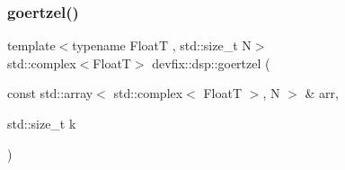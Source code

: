 \subsubsection{\texorpdfstring{goertzel()}{goertzel()}\hspace{0.1cm}{\footnotesize\ttfamily [3/3]}}
{\footnotesize\ttfamily template$<$typename FloatT , std\+::size\+\_\+t N$>$ \\
std\+::complex$<$FloatT$>$ devfix\+::dsp\+::goertzel (\begin{DoxyParamCaption}\item[{const std\+::array$<$ std\+::complex$<$ FloatT $>$, N $>$ \&}]{arr,  }\item[{std\+::size\+\_\+t}]{k }\end{DoxyParamCaption})}

